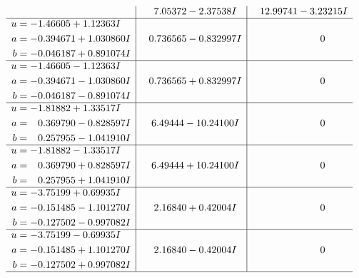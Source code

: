 \documentclass[1p]{elsarticle_modified}
\theoremstyle{definition}
\begin{document}
$$\begin{array}{c|c|c}
 & \phantom{-}7.05372 - 2.37538 I & \phantom{-}12.99741 - 3.23215 I \\ \hline\begin{aligned}
u &= -1.46605 + 1.12363 I \\
a &= -0.394671 + 1.030860 I \\
b &= -0.046187 + 0.891074 I\end{aligned}
 & \phantom{-}0.736565 - 0.832997 I & \phantom{-0.000000 } 0 \\ \hline\begin{aligned}
u &= -1.46605 - 1.12363 I \\
a &= -0.394671 - 1.030860 I \\
b &= -0.046187 - 0.891074 I\end{aligned}
 & \phantom{-}0.736565 + 0.832997 I & \phantom{-0.000000 } 0 \\ \hline\begin{aligned}
u &= -1.81882 + 1.33517 I \\
a &= \phantom{-}0.369790 - 0.828597 I \\
b &= \phantom{-}0.257955 - 1.041910 I\end{aligned}
 & \phantom{-}6.49444 - 10.24100 I & \phantom{-0.000000 } 0 \\ \hline\begin{aligned}
u &= -1.81882 - 1.33517 I \\
a &= \phantom{-}0.369790 + 0.828597 I \\
b &= \phantom{-}0.257955 + 1.041910 I\end{aligned}
 & \phantom{-}6.49444 + 10.24100 I & \phantom{-0.000000 } 0 \\ \hline\begin{aligned}
u &= -3.75199 + 0.69935 I \\
a &= -0.151485 - 1.101270 I \\
b &= -0.127502 - 0.997082 I\end{aligned}
 & \phantom{-}2.16840 + 0.42004 I & \phantom{-0.000000 } 0 \\ \hline\begin{aligned}
u &= -3.75199 - 0.69935 I \\
a &= -0.151485 + 1.101270 I \\
b &= -0.127502 + 0.997082 I\end{aligned}
 & \phantom{-}2.16840 - 0.42004 I & \phantom{-0.000000 } 0\\
 \hline 
 \end{array}$$\newpage$$\begin{array}{c|c|c}  

\end{array}$$
\end{document}

